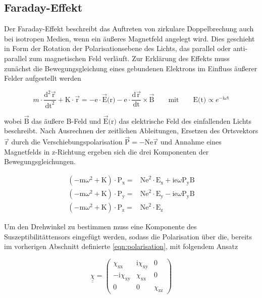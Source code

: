     \subsection{Faraday-Effekt}
        Der Faraday-Effekt beschreibt das Auftreten von zirkulare Doppelbrechung auch bei isotropen Medien, wenn ein äußeres Magnetfeld angelegt wird. Dies geschieht in Form der Rotation der Polarisationsebene
        des Lichts, das parallel oder anti-parallel zum magnetischen Feld verläuft. Zur Erklärung des Effekts muss zunächst die Bewegungsgleichung eines gebundenen Elektrons im  Einfluss äußerer Felder
        aufgestellt werden

        \begin{equation*}
            m \cdot \frac{\text{d}^2\vec{\text{r}}}{\text{dt}^2} + \text{K} \cdot \vec{\text{r}} = -\text{e} \cdot \vec{\text{E}}\text{(r)} - \text{e} \cdot \frac{\text{d}\vec{\text{r}}}{\text{dt}} \times \vec{\text{B}} \qquad \text{mit} \qquad \text{E(t)} \propto e^{-\text{i} \omega \text{t}}
        \end{equation*}

        wobei $\vec{\text{B}}$ das äußere B-Feld und $\vec{\text{E}}\text{(r)}$ das elektrische Feld des einfallenden Lichts beschreibt. Nach Ausrechnen der zeitlichen Ableitungen, Ersetzen des Ortsvektors
        $\vec{\text{r}}$ durch die Verschiebungspolarisation $\vec{\text{P}} = - \text{Ne} \vec{\text{r}}$ und Annahme eines Magnetfelds in z-Richtung ergeben sich die drei Komponenten der Bewegungsgleichungen.

        \begin{align*}
            \left(-\text{m}\omega^2 + \text{K}\right) \cdot \text{P}_{\text{x}} =& \text{Ne}^2 \cdot \text{E}_{\text{x}} + \text{ie} \omega \text{P}_{\text{y}} \text{B} \\
            \left(-\text{m}\omega^2 + \text{K}\right) \cdot \text{P}_{\text{y}} =& \text{Ne}^2 \cdot \text{E}_{\text{y}} - \text{ie} \omega \text{P}_{\text{y}} \text{B} \\
            \left(-\text{m}\omega^2 + \text{K}\right) \cdot \text{P}_{\text{z}} =& \text{Ne}^2 \cdot \text{E}_{\text{z}}
        \end{align*}

        Um den Drehwinkel zu bestimmen muss eine Komponente des Suszeptibilitättensors eingefügt werden, sodass die Polarisation über die, bereits im vorherigen Abschnitt definierte \ref{eqn:polarisation}, mit
        folgendem Ansatz 

        \begin{equation*}
            \underline{\underline{\chi}} =
            \begin{pmatrix}
                \chi_{\text{xx}} & \text{i} \chi_{\text{xy}} & 0 \\
                -\text{i}\chi_{\text{xy}} & \chi_{\text{xx}} & 0 \\
                0 & 0 & \chi_{\text{zz}}
            \end{pmatrix}
            \label{eqn:suszeptibilität2}
        \end{equation*}


